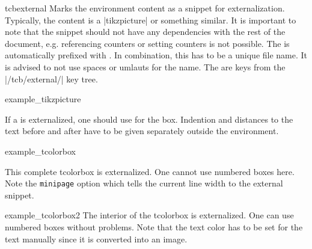 \begin{docEnvironment}[doc new=2015-03-11]{tcbexternal}{}
Marks the environment content as a snippet for externalization.
Typically, the content is a |tikzpicture| or something similar.
It is important to note that the snippet should not have any dependencies
with the rest of the document, e.g. referencing counters or setting counters
is not possible.
The  is automatically prefixed with .
In combination, this has to be a unique file name. It is advised to not
use spaces or umlauts for the name.
The  are keys from the |/tcb/external/| key tree.

\begin{dispExample}
\begin{tcbexternal}{example_tikzpicture}
\end{tcbexternal}
\end{dispExample}

\medskip

If a  is externalized, one should use
 for the box. Indention and distances to
the text before and after have to be given separately outside the
 environment.

\begin{dispExample}
\noindent%
\begin{tcbexternal}[minipage]{example_tcolorbox}
  \begin{tcolorbox}[nobeforeafter,enhanced,
      fonttitle=\bfseries,title=Externalized Box,
      colframe=red!50!black,drop fuzzy shadow,
      interior style={fill overzoom image=goldshade.png}]
    This complete tcolorbox is externalized. One cannot use numbered
    boxes here. Note the \texttt{minipage} option which tells the
    current line width to the external snippet.
  \end{tcolorbox}
\end{tcbexternal}
\end{dispExample}

\begin{dispExample}
\begin{tcolorbox}[nobeforeafter,enhanced,
      fonttitle=\bfseries,title=Externalized Box,
      colframe=blue!50!black,
      interior style={fill overzoom image=blueshade.png}]
  \begin{tcbexternal}[minipage]{example_tcolorbox2}
    \color{white}%
    The interior of the tcolorbox is externalized.
    One can use numbered boxes without problems.
    Note that the text color has to be set for the text manually
    since it is converted into an image.
  \end{tcbexternal}
\end{tcolorbox}
\end{dispExample}


\end{docEnvironment}
